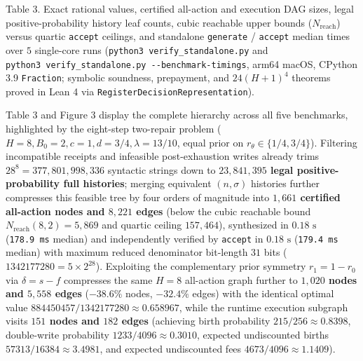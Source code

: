 \documentclass[11pt,letterpaper]{article}
\begin{document}
Table 3. Exact rational values, certified all-action and execution DAG
sizes, legal positive-probability history leaf counts, cubic reachable
upper bounds (\(N_{\mathrm{reach}}\)) versus quartic \texttt{accept}
ceilings, and standalone \texttt{generate} / \texttt{accept} median
times over \(5\) single-core runs
(\texttt{python3\ verify\_standalone.py} and
\texttt{python3\ verify\_standalone.py\ -\/-benchmark-timings}, arm64
macOS, CPython 3.9 \texttt{Fraction}; symbolic soundness, prepayment,
and \(24(H+1)^4\) theorems proved in Lean 4 via
\texttt{RegisterDecisionRepresentation}).

Table 3 and Figure 3 display the complete hierarchy across all five
benchmarks, highlighted by the eight-step two-repair problem
(\(H = 8, B_0 = 2, c = 1, d = 3/4, \lambda = 13/10\), equal prior on
\(r_\theta \in \{1/4, 3/4\}\)). Filtering incompatible receipts and
infeasible post-exhaustion writes already trims
\(28^8 = 377,801,998,336\) syntactic strings down to
\textbf{\(23,841,395\) legal positive-probability full histories};
merging equivalent \((n, \sigma)\) histories further compresses this
feasible tree by four orders of magnitude into \textbf{\(1,661\)
certified all-action nodes and \(8,221\) edges} (below the cubic
reachable bound \(N_{\mathrm{reach}}(8, 2) = 5,869\) and quartic ceiling
\(157,464\)), synthesized in \(0.18\text{ s}\) (\texttt{178.9\ ms}
median) and independently verified by \texttt{accept} in
\(0.18\text{ s}\) (\texttt{179.4\ ms} median) with maximum reduced
denominator bit-length \(31\) bits (\(1342177280 = 5 \times 2^{28}\)).
Exploiting the complementary prior symmetry \(r_1 = 1 - r_0\) via
\(\delta = s - f\) compresses the same \(H = 8\) all-action graph
further to \textbf{\(1,020\) nodes and \(5,558\) edges} (\(-38.6\%\)
nodes, \(-32.4\%\) edges) with the identical optimal value
\(884450457 / 1342177280 \approx 0.658967\), while the runtime execution
subgraph visits \textbf{\(151\) nodes and \(182\) edges} (achieving
birth probability \(215 / 256 \approx 0.8398\), double-write probability
\(1233 / 4096 \approx 0.3010\), expected undiscounted births
\(57313 / 16384 \approx 3.4981\), and expected undiscounted fees
\(4673 / 4096 \approx 1.1409\)).
\end{document}
